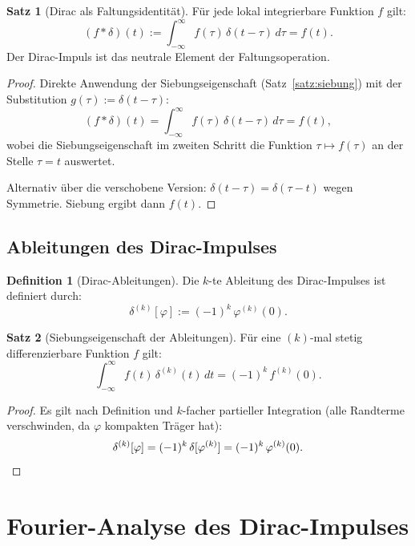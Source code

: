 ﻿\documentclass[a4paper,12pt]{article}
\theoremstyle{definition}
\newtheorem{definition}{Definition}
\newtheorem{satz}{Satz}
\begin{document}
\begin{satz}[Dirac als Faltungsidentit\"at]
\label{satz:faltung}
F\"ur jede lokal integrierbare Funktion $f$ gilt:
\[
(f * \delta)(t) := \int_{-\infty}^{\infty} f(\tau)\,\delta(t - \tau)\,d\tau = f(t).
\]
Der Dirac-Impuls ist das neutrale Element der Faltungsoperation.
\end{satz}

\begin{proof}
Direkte Anwendung der Siebungseigenschaft (Satz~\ref{satz:siebung}) mit der Substitution
$g(\tau) := \delta(t - \tau)$:
\[
(f * \delta)(t) = \int_{-\infty}^{\infty} f(\tau)\,\delta(t - \tau)\,d\tau = f(t),
\]
wobei die Siebungseigenschaft im zweiten Schritt die Funktion $\tau \mapsto f(\tau)$ an der
Stelle $\tau = t$ auswertet.

Alternativ \"uber die verschobene Version: $\delta(t - \tau) = \delta(\tau - t)$ wegen
Symmetrie. Siebung ergibt dann $f(t)$.
\end{proof}

\subsection{Ableitungen des Dirac-Impulses}

\begin{definition}[Dirac-Ableitungen]
Die $k$-te Ableitung des Dirac-Impulses ist definiert durch:
\[
\delta^{(k)}[\varphi] := (-1)^k\,\varphi^{(k)}(0).
\]
\end{definition}

\begin{satz}[Siebungseigenschaft der Ableitungen]
\label{satz:ableitungen}
F\"ur eine $(k)$-mal stetig differenzierbare Funktion $f$ gilt:
\[
\int_{-\infty}^{\infty} f(t)\,\delta^{(k)}(t)\,dt = (-1)^k\,f^{(k)}(0).
\]
\end{satz}

\begin{proof}
Es gilt nach Definition und $k$-facher partieller Integration (alle Randterme verschwinden,
da $\varphi$ kompakten Tr\"ager hat):
\[
\delta^{(k)}[\varphi] = (-1)^k\,\delta[\varphi^{(k)}] = (-1)^k\,\varphi^{(k)}(0). \qedhere
\]
\end{proof}

\section{Fourier-Analyse des Dirac-Impulses}
\label{sec:fourier}
\end{document}
